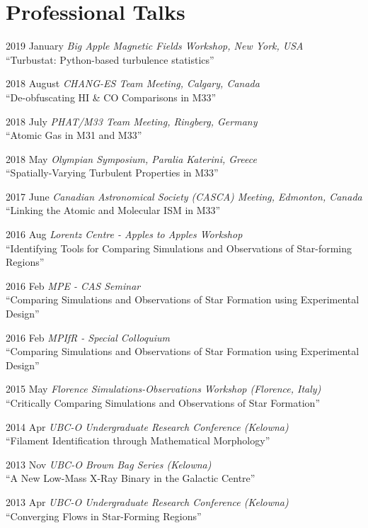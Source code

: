 \documentclass[letterpaper,11pt]{article}
\newlength{\mainindent} \setlength{\mainindent}{12pt}
\newlength{\contentindent} \setlength{\contentindent}{19ex}
\newenvironment{datelist}{
  \begingroup
  \raggedright
  \begin{description}[labelindent=\mainindent,leftmargin=\contentindent,
      style=sameline,font=\normalfont,topsep=0pt,partopsep=0pt,parsep=0pt,
      itemsep=4pt]
}{
  \end{description}
  \endgroup
}
\begin{document}
\section*{Professional Talks}
\begin{datelist}
\item[2019 January] \emph{Big Apple Magnetic Fields Workshop, New York, USA} \\ ``Turbustat: Python-based turbulence statistics''
\item[2018 August] \emph{CHANG-ES Team Meeting, Calgary, Canada} \\ ``De-obfuscating HI \& CO Comparisons in M33''
\item[2018 July] \emph{PHAT/M33 Team Meeting, Ringberg, Germany} \\ ``Atomic Gas in M31 and M33''
\item[2018 May] \emph{Olympian Symposium, Paralia Katerini, Greece} \\ ``Spatially-Varying Turbulent Properties in M33''
\item[2017 June] \emph{Canadian Astronomical Society (CASCA) Meeting, Edmonton, Canada} \\ ``Linking the Atomic and Molecular ISM in M33''
\item[2016 Aug] \emph{Lorentz Centre - Apples to Apples Workshop} \\ ``Identifying Tools for Comparing Simulations and Observations of Star-forming Regions''
\item[2016 Feb] \emph{MPE - CAS Seminar} \\ ``Comparing Simulations and Observations of Star Formation using Experimental Design''
\item[2016 Feb] \emph{MPIfR - Special Colloquium} \\ ``Comparing Simulations and Observations of Star Formation using Experimental Design''
\item[2015 May] \emph{Florence Simulations-Observations Workshop (Florence, Italy)} \\ ``Critically Comparing Simulations and Observations of Star Formation''
\item[2014 Apr] \emph{UBC-O Undergraduate Research Conference (Kelowna)} \\ ``Filament Identification through Mathematical Morphology''
\item[2013 Nov] \emph{UBC-O Brown Bag Series (Kelowna)} \\ ``A New Low-Mass X-Ray Binary in the Galactic Centre''
\item[2013 Apr] \emph{UBC-O Undergraduate Research Conference (Kelowna)} \\ ``Converging Flows in Star-Forming Regions''
\end{datelist}
\end{document}
